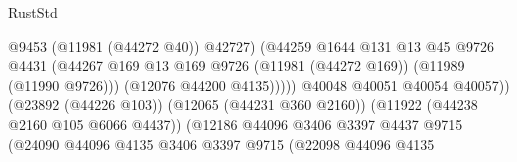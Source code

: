 \begin{lexlean}{RustStd}
\begin{coremodule}
                                                            @9453
                                                            (@11981 (@44272 @40))
                                                            @42727)
                                                          (@44259
                                                            @1644
                                                            @131
                                                            @13
                                                            @45
                                                            @9726
                                                            @4431
                                                            (@44267
                                                              @169
                                                              @13
                                                              @169
                                                              @9726
                                                              (@11981 (@44272 @169))
                                                              (@11989 (@11990 @9726)))
                                                            (@12076 @44200 @4135)))))
                                                    @40048
                                                    @40051
                                                    @40054
                                                    @40057))
                                                (@23892 (@44226 @103))
                                                (@12065 (@44231 @360 @2160))
                                                (@11922 (@44238 @2160 @105 @6066 @4437))
                                                (@12186
                                                  @44096
                                                  @3406
                                                  @3397
                                                  @4437
                                                  @9715
                                                  (@24090
                                                    @44096
                                                    @4135
                                                    @3406
                                                    @3397
                                                    @9715
                                                    (@22098
                                                      @44096
                                                      @4135

\end{coremodule}
\end{lexlean}
